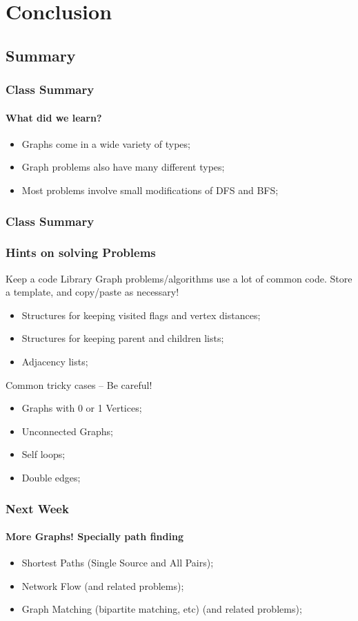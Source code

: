 
\section{Conclusion}
\subsection{Summary}
\begin{frame}
  \frametitle{Class Summary}
  \framesubtitle{What did we learn?}
  \begin{itemize}
  \item Graphs come in a wide variety of types;
  \item Graph problems also have many different types;
  \item Most problems involve small modifications of DFS and BFS;
  \end{itemize}
\end{frame}

\begin{frame}
  \frametitle{Class Summary}
  \frametitle{Hints on solving Problems}


  {\smaller
    \begin{block}{Keep a code Library}
      Graph problems/algorithms use a lot of common code. Store a
      template, and copy/paste as necessary!
      \bigskip
      \begin{itemize}
      \item Structures for keeping visited flags and vertex distances;
      \item Structures for keeping parent and children lists;
      \item Adjacency lists;
      \end{itemize}

  \end{block}
  \begin{block}{Common tricky cases -- Be careful!}
    \begin{itemize}
    \item Graphs with 0 or 1 Vertices;
    \item Unconnected Graphs;
    \item Self loops;
    \item Double edges;
    \end{itemize}
  \end{block}
  }
\end{frame}

\begin{frame}
  \frametitle{Next Week}
  \framesubtitle{More Graphs! Specially path finding}
  \begin{itemize}
  \item Shortest Paths (Single Source and All Pairs);
  \item Network Flow (and related problems);
  \item Graph Matching (bipartite matching, etc) (and related problems);
  \end{itemize}
\end{frame}


